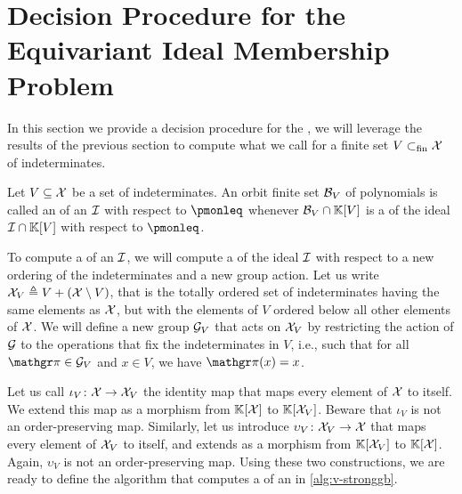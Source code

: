 %
\section{Decision Procedure for the Equivariant Ideal Membership Problem}
\label{sec:algorithm}

In this section we provide a decision procedure for the , we will leverage the results of the previous section
to compute what we call  for a finite set
$V \subset_{\text{fin}} \mathcal{X}$ of indeterminates.

\begin{definition}
  \label{def:strong-equiv-grob}
  Let $V \subseteq \mathcal{X}$ be a set of indeterminates.
  An orbit finite set $\Basis_V$
  of polynomials is called an 
  of an  $\idl$ with respect to $\pmonleq$
  whenever $\Basis_V \cap \poly{\K}{V}$ is a
   of the ideal $\idl \cap \poly{\K}{V}$ with respect to
  $\pmonleq$.
\end{definition}

\AP To compute a  of an
 $\idl$, we will compute a  of the ideal $\idl$ with respect to a new ordering of the indeterminates
and a new group action. Let us write $\IndetsV[V] \defined V + (\Indets
\setminus V)$, that is the totally ordered set of indeterminates having the
same elements as $\mathcal{X}$, but with the elements of $V$ ordered below all
other elements of $\mathcal{X}$.
We will define a new group $\mathcal{G}_V$ that acts on $\IndetsV[V]$ by
restricting the action of $\mathcal{G}$ to the operations that fix the
indeterminates in $V$, i.e., such that for all $\gelem \in \group_V$ and
$x \in V$, we have $\gelem(x) = x$.

Let us call $\iota_V \colon \Indets \to \IndetsV[V]$ the identity map that maps
every element of $\mathcal{X}$ to itself. We extend this map as a morphism from
$\mathbb{K}[\mathcal{X}]$ to $\poly{\K}{\IndetsV[V]}$. Beware that $\iota_V$ is not
an order-preserving map. Similarly, let us introduce $\upsilon_V \colon
\IndetsV[V] \to \Indets$ that maps every element of $\IndetsV[V]$ to itself,
and extends as a morphism from $\poly{\K}{\IndetsV[V]}$ to
$\mathbb{K}[\mathcal{X}]$. Again, $\upsilon_V$ is not an order-preserving map.
Using these two constructions, we are ready to define the algorithm that computes
a  of an 
in \cref{alg:v-stronggb}.

